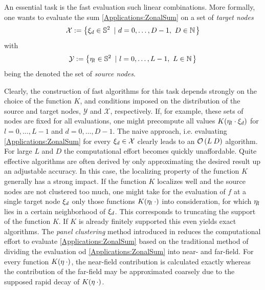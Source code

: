 An essential task is the fast evaluation such linear combinations. More formally, 
one wants to evaluate the sum \eqref{Applications:ZonalSum}
on a set of \emph{target nodes} 
$$
  \mathcal{X} := \left\{\mathbf{\xi}_{d} \in \mathbb{S}^2\ \left|\ d=0,\ldots,D-1,\ D \in \mathbb{N}\right.\right\rbrace
$$ 
with 
$$
  \mathcal{Y} := \left\{\mathbf{\eta}_{l} \in \mathbb{S}^2\ \left|\ l = 0,\ldots,L-1,\ L \in \mathbb{N}\right.\right\rbrace
$$
being the denoted the set of \emph{source nodes}.

Clearly, the construction of fast algorithms for this task depends strongly on the
choice of the function $K$, and conditions imposed on the distribution of the 
source and target nodes, $\mathcal{Y}$ and $\mathcal{X}$, respectively.
If, for example, these sets of nodes are fixed for all evaluations, one might 
precompute all values $ K{\hspace{-0.4ex}}\left(\mathbf{\eta}_{l}\cdot\mathbf{\xi}_{d}\right)$ for $l=0,\ldots,L-1$ and 
$d=0,\ldots,D-1$.
The naive approach, i.e. evaluating \eqref{Applications:ZonalSum} for every $\mathbf{\xi}_{d} \in \mathcal{X}$ clearly leads to an $\mathcal{O}\left(L\:D\right)$ algorithm. For large $L$ and $D$ the computational effort becomes quickly unaffordable.
Quite effective algorithms are often derived by only approximating the desired result 
up an adjustable accuracy. In this case, the localizing property of the function $K$ 
generally has a strong impact. If the function $K$ localizes well and the source nodes 
are not clustered too much, one might take for the evaluation of $f$ at a single target node $\mathbf{\xi}_{d}$ only those functions $K{\hspace{-0.4ex}}\left(\mathbf{\eta}_{l}\:\cdot\right)$ into consideration, for
which $\mathbf{\eta}_{l}$ lies in a certain neighborhood of $\mathbf{\xi}_{d}$. This corresponds to truncating the support of the function $K$. If $K$ is already finitely supported this even
yields exact algorithms. 
The \emph{panel clustering} method introduced in \cite{FrGlSch98} reduces the computational effort to evaluate \eqref{Applications:ZonalSum} based on the traditional method of dividing the evaluation od \eqref{Applications:ZonalSum} into near- and far-field. For every function
$K{\hspace{-0.4ex}}\left(\mathbf{\eta} \: \cdot\right)$, the near-field contribution is calculated exactly whereas the contribution of the far-field may be approximated coarsely due to the supposed rapid decay of $K{\hspace{-0.4ex}}\left(\mathbf{\eta} \: \cdot\right)$. 

